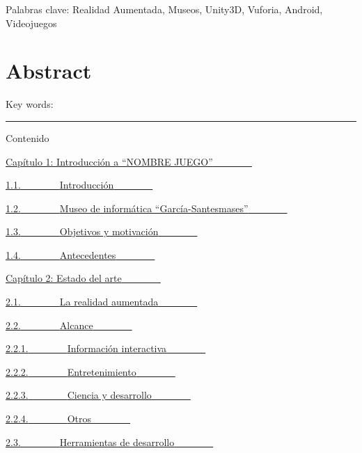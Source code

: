 \documentclass[]{article}
\begin{document}
Palabras clave: Realidad Aumentada, Museos, Unity3D, Vuforia, Android,
Videojuegos

\section{Abstract}\label{h.74j509ivflvc}

Key words:

\begin{center}\rule{3in}{0.4pt}\end{center}

Contenido

\hyperref[h.gjdgxs]{Capítulo 1: Introducción a ``NOMBRE
JUEGO''}\hyperref[h.gjdgxs]{~~~~~~~~}

\hyperref[h.30j0zll]{1.1.}\hyperref[h.30j0zll]{~~~~~~~~}\hyperref[h.30j0zll]{Introducción}\hyperref[h.30j0zll]{~~~~~~~~}

\hyperref[h.1fob9te]{1.2.}\hyperref[h.1fob9te]{~~~~~~~~}\hyperref[h.1fob9te]{Museo
de informática ``García-Santesmases''}\hyperref[h.1fob9te]{~~~~~~~~}

\hyperref[h.3znysh7]{1.3.}\hyperref[h.3znysh7]{~~~~~~~~}\hyperref[h.3znysh7]{Objetivos
y motivación}\hyperref[h.3znysh7]{~~~~~~~~}

\hyperref[h.2et92p0]{1.4.}\hyperref[h.2et92p0]{~~~~~~~~}\hyperref[h.2et92p0]{Antecedentes}\hyperref[h.2et92p0]{~~~~~~~~}

\hyperref[h.tyjcwt]{Capítulo 2: Estado del
arte}\hyperref[h.tyjcwt]{~~~~~~~~}

\hyperref[h.3dy6vkm]{2.1.}\hyperref[h.3dy6vkm]{~~~~~~~~}\hyperref[h.3dy6vkm]{La
realidad aumentada}\hyperref[h.3dy6vkm]{~~~~~~~~}

\hyperref[h.1t3h5sf]{2.2.}\hyperref[h.1t3h5sf]{~~~~~~~~}\hyperref[h.1t3h5sf]{Alcance}\hyperref[h.1t3h5sf]{~~~~~~~~}

\hyperref[h.4d34og8]{2.2.1.}\hyperref[h.4d34og8]{~~~~~~~~}\hyperref[h.4d34og8]{Información
interactiva}\hyperref[h.4d34og8]{~~~~~~~~}

\hyperref[h.2s8eyo1]{2.2.2.}\hyperref[h.2s8eyo1]{~~~~~~~~}\hyperref[h.2s8eyo1]{Entretenimiento}\hyperref[h.2s8eyo1]{~~~~~~~~}

\hyperref[h.17dp8vu]{2.2.3.}\hyperref[h.17dp8vu]{~~~~~~~~}\hyperref[h.17dp8vu]{Ciencia
y desarrollo}\hyperref[h.17dp8vu]{~~~~~~~~}

\hyperref[h.3rdcrjn]{2.2.4.}\hyperref[h.3rdcrjn]{~~~~~~~~}\hyperref[h.3rdcrjn]{Otros}\hyperref[h.3rdcrjn]{~~~~~~~~}

\hyperref[h.26in1rg]{2.3.}\hyperref[h.26in1rg]{~~~~~~~~}\hyperref[h.26in1rg]{Herramientas
de desarrollo}\hyperref[h.26in1rg]{~~~~~~~~}
\end{document}

